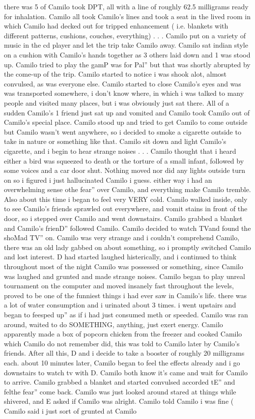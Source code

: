 \documentclass[12pt]{book}
\begin{document}
there was 5 of Camilo took DPT, all with a line of roughly 62.5 milligrams ready for inhalation. Camilo all took Camilo's lines and took a seat in the lived room in which Camilo had decked out for tripped enhancement ( i.e. blankets with different patterns, cushions, couches, everything) . . .  Camilo put on a variety of music in the cd player and let the trip take Camilo away. Camilo sat indian style on a cushion with Camilo's hands together as 3 others laid down and 1 was stood up. Camilo tried to play the gamP was for Pal'' but that was shortly abrupted by the come-up of the trip. Camilo started to notice i was shook alot, almost convulsed, as was everyone else. Camilo started to close Camilo's eyes and was was transported somewhere, i don't know where, in which i was talked to many people and visited many places, but i was obviously just sat there. All of a sudden Camilo's 1 friend just sat up and vomited and Camilo took Camilo out of Camilo's special place. Camilo stood up and tried to get Camilo to come outside but Camilo wasn't went anywhere, so i decided to smoke a cigarette outside to take in nature or something like that. Camilo sit down and light Camilo's cigarette, and i begin to hear strange noises . . .  Camilo thought that i heard either a bird was squeezed to death or the torture of a small infant, followed by some voices and a car door shut. Nothing moved nor did any lights outside turn on so i figured i just hallucinated Camilo i guess. either way i had an overwhelming sense othe fear'' over Camilo, and everything make Camilo tremble. Also about this time i began to feel very VERY cold. Camilo walked inside, only to see Camilo's friends sprawled out everywhere, and vomit stains in front of the door, so i stepped over Camilo and went downstairs. Camilo grabbed a blanket and Camilo's frienD'' followed Camilo. Camilo decided to watch TVand found the shoMad TV'' on. Camilo was very strange and i couldn't comprehend Camilo, there was an old lady gabbed on about something, so i promptly switched Camilo and lost interest. D had started laughed histerically, and i continued to think throughout most of the night Camilo was possessed or something, since Camilo was laughed and grunted and made strange noises. Camilo began to play unreal tournament on the computer and moved insanely fast throughout the levels, proved to be one of the funniest things i had ever saw in Camilo's life. there was a lot of water consumption and i urinated about 3 times. i went upstairs and began to feesped up'' as if i had just consumed meth or speeded. Camilo was ran around, waited to do SOMETHING, anything, just exert energy. Camilo apparently made a box of popcorn chicken from the freezer and cooked Camilo which Camilo do not remember did, this was told to Camilo later by Camilo's friends. After all this, D and i decide to take a booster of roughly 20 milligrams each. about 10 minutes later, Camilo began to feel the effects already and i go downstairs to watch tv with D. Camilo both know it's came and wait for Camilo to arrive. Camilo grabbed a blanket and started convulsed accorded tE'' and felthe fear'' come back. Camilo was just looked around stared at things while shivered, and E asked if Camilo was alright. Camilo told Camilo i was fine ( Camilo said i just sort of grunted at Camilo 
\end{document}
